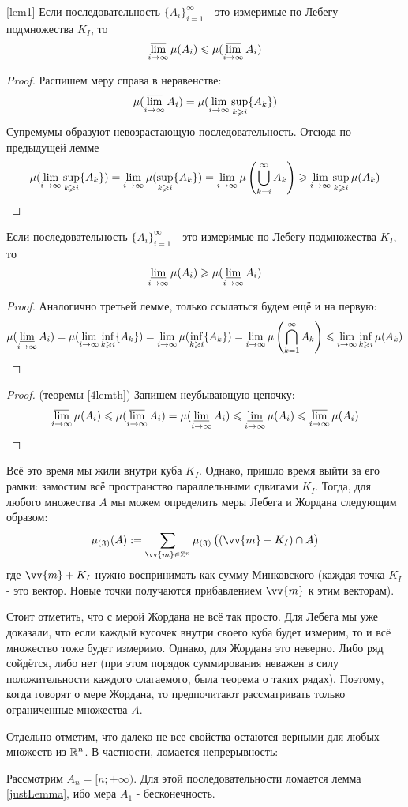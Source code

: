 \begin{lemma} \ref{lem1}
	Если последовательность $\{A_i\}_{i = 1}^\infty$ - это измеримые по Лебегу подмножества $K_I$, то
	\[
		\varlimsup_{i \to \infty} \mu(A_i) \le \mu(\varlimsup_{i \to \infty} A_i)
	\]
\end{lemma}

\begin{proof}
	Распишем меру справа в неравенстве:
	\[
		\mu(\varlimsup_{i \to \infty} A_i) = \mu(\liml_{i \to \infty} \sup_{k \ge i} \{A_k\})
	\]
	Супремумы образуют невозрастающую последовательность. Отсюда по предыдущей лемме
	\[
		\mu(\liml_{i \to \infty} \sup_{k \ge i} \{A_k\}) = \liml_{i \to \infty} \mu(\sup_{k \ge i} \{A_k\}) = \liml_{i \to \infty} \mu\left(\bigcup_{k = i}^\infty A_k\right) \ge \liml_{i \to \infty} \sup_{k \ge i} \mu(A_k)
	\]
\end{proof}

\begin{lemma}
	Если последовательность $\{A_i\}_{i = 1}^\infty$ - это измеримые по Лебегу подмножества $K_I$, то
	\[
		\varliminf_{i \to \infty} \mu(A_i) \ge \mu(\varliminf_{i \to \infty} A_i)
	\]
\end{lemma}

\begin{proof}
	Аналогично третьей лемме, только ссылаться будем ещё и на первую:
	\[
		\mu(\varliminf_{i \to \infty} A_i) = \mu(\liml_{i \to \infty} \inf_{k \ge i} \{A_k\}) = \liml_{i \to \infty} \mu(\inf_{k \ge i} \{A_k\}) = \liml_{i \to \infty} \mu\left(\bigcap_{k = 1}^\infty A_k\right) \le \liml_{i \to \infty} \inf_{k \ge i} \mu(A_k)
	\]
\end{proof}

\begin{proof} (теоремы \ref{4lemth})
	Запишем неубывающую цепочку:
	\[
		\varlimsup_{i \to \infty} \mu(A_i) \le \mu(\varlimsup_{i \to \infty} A_i) = \mu(\varliminf_{i \to \infty} A_i) \le \varliminf_{i \to \infty} \mu(A_i) \le \varlimsup_{i \to \infty} \mu(A_i)
	\]
\end{proof}

\begin{note}
	Всё это время мы жили внутри куба $K_I$. Однако, пришло время выйти за его рамки: замостим всё пространство параллельными сдвигами $K_I$. Тогда, для любого множества $A$ мы можем определить меры Лебега и Жордана следующим образом:
	\[
		\jlm(A) := \sum_{\vv{m} \in \Z^n} \jlm\big((\vv{m} + K_I) \cap A\big)
	\]
	где $\vv{m} + K_I$ нужно воспринимать как сумму Минковского (каждая точка $K_I$ - это вектор. Новые точки получаются прибавлением $\vv{m}$ к этим векторам).
	
	Стоит отметить, что с мерой Жордана не всё так просто. Для Лебега мы уже доказали, что если каждый кусочек внутри своего куба будет измерим, то и всё множество тоже будет измеримо. Однако, для Жордана это неверно. Либо ряд сойдётся, либо нет (при этом порядок суммирования неважен в силу положительности каждого слагаемого, была теорема о таких рядах). Поэтому, когда говорят о мере Жордана, то предпочитают рассматривать только ограниченные множества $A$.
\end{note}

\begin{note}
	Отдельно отметим, что далеко не все свойства остаются верными для любых множеств из $\R^n$. В частности, ломается непрерывность:
	
	Рассмотрим $A_n = [n; +\infty)$. Для этой последовательности ломается лемма \ref{justLemma}, ибо мера $A_1$ - бесконечность.
\end{note}